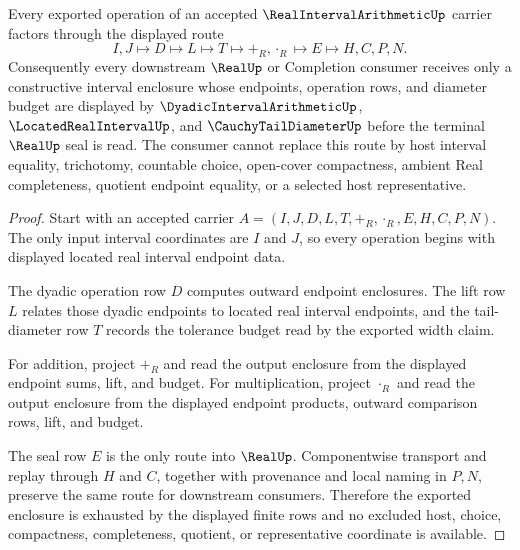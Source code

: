 \begin{theorem}
\label{thm:real-interval-arithmetic-enclosure-soundness}
Every exported operation of an accepted $\RealIntervalArithmeticUp$ carrier factors through the displayed route
$$
I,J \longmapsto D \longmapsto L \longmapsto T \longmapsto +_R,\cdot_R \longmapsto E \longmapsto H,C,P,N .
$$
Consequently every downstream $\RealUp$ or Completion consumer receives only a constructive interval enclosure whose endpoints, operation rows, and diameter budget are displayed by $\DyadicIntervalArithmeticUp$, $\LocatedRealIntervalUp$, and $\CauchyTailDiameterUp$ before the terminal $\RealUp$ seal is read. The consumer cannot replace this route by host interval equality, trichotomy, countable choice, open-cover compactness, ambient Real completeness, quotient endpoint equality, or a selected host representative.
\end{theorem}
\begin{proof}
Start with an accepted carrier $A=(I,J,D,L,T,+_R,\cdot_R,E,H,C,P,N)$. The only input interval coordinates are $I$ and $J$, so every operation begins with displayed located real interval endpoint data.

The dyadic operation row $D$ computes outward endpoint enclosures. The lift row $L$ relates those dyadic endpoints to located real interval endpoints, and the tail-diameter row $T$ records the tolerance budget read by the exported width claim.

For addition, project $+_R$ and read the output enclosure from the displayed endpoint sums, lift, and budget. For multiplication, project $\cdot_R$ and read the output enclosure from the displayed endpoint products, outward comparison rows, lift, and budget.

The seal row $E$ is the only route into $\RealUp$. Componentwise transport and replay through $H$ and $C$, together with provenance and local naming in $P,N$, preserve the same route for downstream consumers. Therefore the exported enclosure is exhausted by the displayed finite rows and no excluded host, choice, compactness, completeness, quotient, or representative coordinate is available.
\end{proof}


